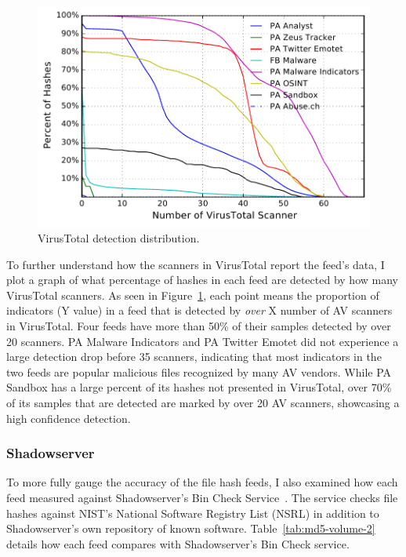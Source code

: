 \begin{figure}[t]
\includegraphics[width=0.8\columnwidth]{data_character/images/hash_vt_cdf.pdf}
\caption{VirusTotal detection distribution.}
\label{fig:vt-cdf}
\end{figure}

To further understand how the scanners in VirusTotal report the feed's data,
I plot a graph of what percentage of hashes in each feed are detected by how many
VirusTotal scanners. As seen in Figure~\ref{fig:vt-cdf}, each point means the proportion of indicators (Y value) in a feed that is detected by \textit{over} X number of AV scanners in VirusTotal. Four feeds have more
than 50\% of their samples detected by over 20 scanners. PA Malware Indicators
and PA Twitter Emotet did not experience a large detection drop before 35 scanners,
indicating that most indicators in the two feeds are popular malicious files
recognized by many AV vendors. While PA Sandbox has a large percent of its hashes
not presented in VirusTotal, over 70\% of its samples that are detected are marked
by over 20 AV scanners, showcasing a high confidence detection.

\subsubsection{Shadowserver}

To more fully gauge the accuracy of the file hash feeds,
I also examined how each feed measured against Shadowserver's Bin Check
Service~\cite{shadowserver}. The service checks file hashes against NIST's
National Software Registry List (NSRL) in addition to Shadowserver's own repository of
known software. Table~\ref{tab:md5-volume-2} details how each feed compares with
Shadowserver's Bin Check service.

